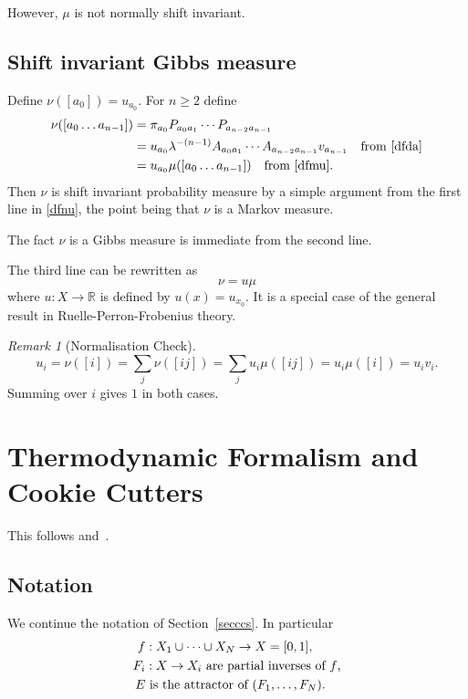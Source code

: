 \documentclass[a4paper]{amsart}
\theoremstyle{plain}
\theoremstyle{definition}
\theoremstyle{remark}
\newtheorem{remark}[theorem]{Remark}
\begin{document}
\medskip However, $ \mu $ is not normally shift invariant.

\subsection{Shift  invariant Gibbs measure} 
Define $ \nu([a_0]) = u_{a_0} $. For $   n\geq 2 $ define
\begin{equation} \label{dfnu}
\begin{aligned} 
\nu([a_0\dots a_{n-1}]) &= \pi_{a_0} P_{a_0a_1}\cdots P_{a_{n-2}a_{n-1}} \\
   &=  u_{a_0} \lambda ^{-(n-1)} A_{a_0a_1}\cdots A_{a_{n-2}a_{n-1}} v_{a_{n-1}} \quad \text{from \eqref{dfda}}\\
  &=  u_{a_0}  \mu([a_0\dots a_{n-1}]) \quad \text{from \eqref{dfmu}}.
  \end{aligned} 
\end{equation}   
 Then $ \nu $ is shift invariant probability measure by a simple argument  from the first line in \eqref{dfnu}, the point being that $ \nu $  is a Markov measure.
 
 The fact $ \nu $ is a Gibbs measure is immediate from the second line. 
 
 The third line can be rewritten as 
\begin{equation} \label{sinv} 
    \nu = u \mu 
    \end{equation} 
     where   $ u :X\to \mathbb{R} $ is defined  by  $ u(x) = u_{x_0} $. It is a special case of the general  result in   Ruelle-Perron-Frobenius theory.
  
 \begin{remark}[Normalisation Check]\label{norch}
 \[
 u_i = \nu([i]) = \sum_j\nu([ij]) =         \sum_j u_i\mu([ij]) = u_i \mu([i]) = u_i v_i.
 \]
Summing over $ i $ gives $ 1 $ in both cases.
 \end{remark}   
  
  
\section{\textbf{Thermodynamic Formalism and Cookie Cutters}}   This follows \cite{Fal} and~\cite{Bed}.

\subsection{Notation}         We continue the notation of Section~\ref{secccs}.  In particular
\begin{align*}
f&: X_1\cup\dots \cup X_N \to X = [0,1],\\
F_i &: X \to X_i \text{ are partial inverses of $ f $,}\\
E &\text{ is the attractor of } (F_1,\dots, F_N).
\end{align*} 
\end{document}
